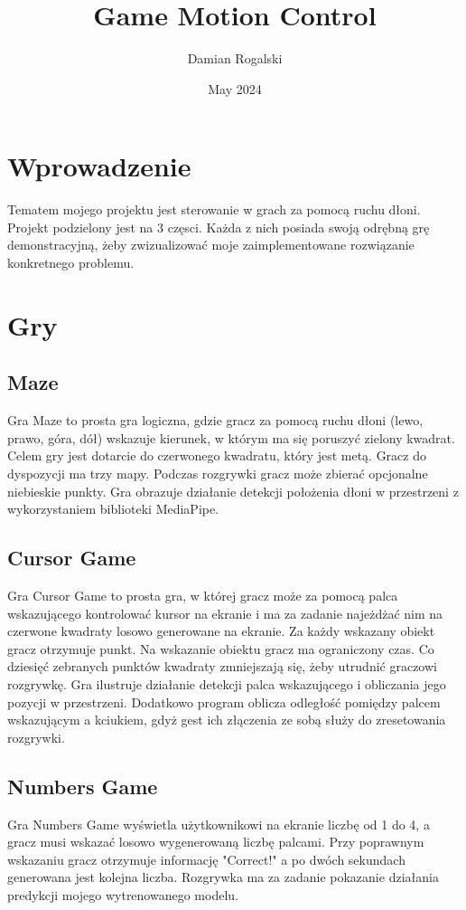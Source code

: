 \documentclass{article}
\title{Game Motion Control}
\author{Damian Rogalski}
\date{May 2024}
\begin{document}
\maketitle

\section{Wprowadzenie}
Tematem mojego projektu jest sterowanie w grach za pomocą ruchu dłoni. Projekt podzielony jest na 3 częsci. Każda z nich posiada swoją odrębną grę demonstracyjną, żeby zwizualizować moje zaimplementowane rozwiązanie konkretnego problemu.

\section{Gry}
\subsection{Maze}
Gra Maze to prosta gra logiczna, gdzie gracz za pomocą ruchu dłoni (lewo, prawo, góra, dół) wskazuje kierunek, w którym ma się poruszyć zielony kwadrat. Celem gry jest dotarcie do czerwonego kwadratu, który jest metą. Gracz do dyspozycji ma trzy mapy. Podczas rozgrywki gracz może zbierać opcjonalne niebieskie punkty. Gra obrazuje działanie detekcji położenia dłoni w przestrzeni z wykorzystaniem biblioteki MediaPipe.

\subsection{Cursor Game}
Gra Cursor Game to prosta gra, w której gracz może za pomocą palca wskazującego kontrolować kursor na ekranie i ma za zadanie najeżdżać nim na czerwone kwadraty losowo generowane na ekranie. Za każdy wskazany obiekt gracz otrzymuje punkt. Na wskazanie obiektu gracz ma ograniczony czas. Co dziesięć zebranych punktów kwadraty zmniejszają się, żeby utrudnić graczowi rozgrywkę. Gra ilustruje działanie detekcji palca wskazującego i obliczania jego pozycji w przestrzeni. Dodatkowo program oblicza odległość pomiędzy palcem wskazującym a kciukiem, gdyż gest ich złączenia ze sobą służy do zresetowania rozgrywki.

\newpage

\subsection{Numbers Game}
Gra Numbers Game wyświetla użytkownikowi na ekranie liczbę od 1 do 4, a gracz musi wskazać losowo wygenerowaną liczbę palcami. Przy poprawnym wskazaniu gracz otrzymuje informację "Correct!" a po dwóch sekundach generowana jest kolejna liczba. Rozgrywka ma za zadanie pokazanie działania predykcji mojego wytrenowanego modelu.
\end{document}
